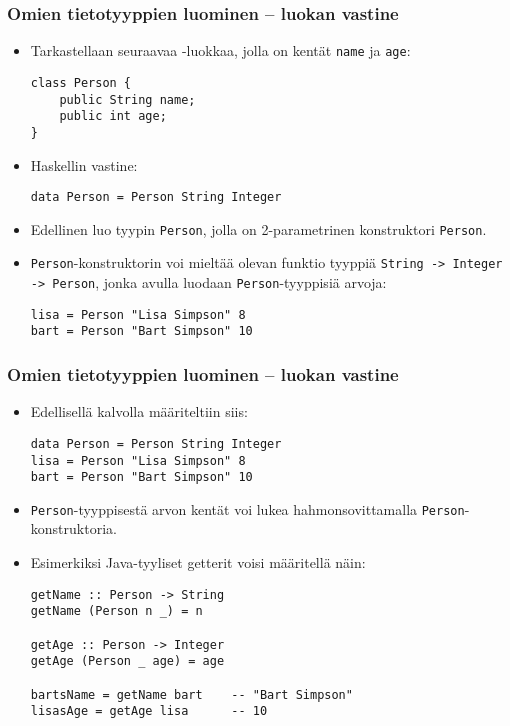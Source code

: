 \documentclass{beamer}
\begin{document}
\begin{frame}[fragile]
\frametitle{Omien tietotyyppien luominen -- luokan vastine}
\begin{itemize}
\item{Tarkastellaan seuraavaa -luokkaa, jolla on kentät \texttt{name} ja \texttt{age}:}
\begin{verbatim}
class Person {
    public String name;
    public int age;
}
\end{verbatim}
\item{Haskellin vastine:}
\begin{verbatim}
data Person = Person String Integer
\end{verbatim}
\item{Edellinen luo tyypin \texttt{Person}, jolla on 2-parametrinen konstruktori \texttt{Person}.}
\item{\texttt{Person}-konstruktorin voi mieltää olevan funktio tyyppiä \mbox{\texttt{String -> Integer -> Person}}, jonka avulla luodaan \texttt{Person}-tyyppisiä arvoja:}
\begin{verbatim}
lisa = Person "Lisa Simpson" 8
bart = Person "Bart Simpson" 10
\end{verbatim}
\end{itemize}
\end{frame}

\begin{frame}[fragile]
\frametitle{Omien tietotyyppien luominen -- luokan vastine}
\begin{itemize}
\item{Edellisellä kalvolla määriteltiin siis:}
\begin{verbatim}
data Person = Person String Integer
lisa = Person "Lisa Simpson" 8
bart = Person "Bart Simpson" 10
\end{verbatim}

\item{\texttt{Person}-tyyppisestä arvon kentät voi lukea hahmonsovittamalla \texttt{Person}-konstruktoria}.
\item{Esimerkiksi Java-tyyliset getterit voisi määritellä näin:}
\begin{verbatim}
getName :: Person -> String
getName (Person n _) = n

getAge :: Person -> Integer
getAge (Person _ age) = age

bartsName = getName bart    -- "Bart Simpson"
lisasAge = getAge lisa      -- 10
\end{verbatim}
\end{itemize}
\end{frame}
\end{document}
